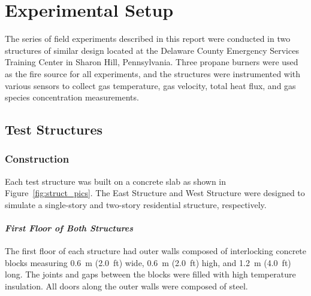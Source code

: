 
\renewcommand{\thechapter}{2}

\chapter{Experimental Setup}
\label{chap:exp_setup}
The series of field experiments described in this report were conducted in two structures of similar design located at the Delaware County Emergency Services Training Center in Sharon Hill, Pennsylvania. Three propane burners were used as the fire source for all experiments, and the structures were instrumented with various sensors to collect gas temperature, gas velocity, total heat flux, and gas species concentration measurements.

\section{Test Structures}

\subsection{Construction}
Each test structure was built on a concrete slab as shown in Figure~\ref{fig:struct_pics}. The East Structure and West Structure were designed to simulate a single-story and two-story residential structure, respectively.

\subsubsection*{\textit{First Floor of Both Structures}}
The first floor of each structure had outer walls composed of interlocking concrete blocks measuring 0.6~m (2.0~ft) wide, 0.6~m (2.0~ft) high, and 1.2~m (4.0~ft) long. The joints and gaps between the blocks were filled with high temperature insulation. All doors along the outer walls were composed of steel.

